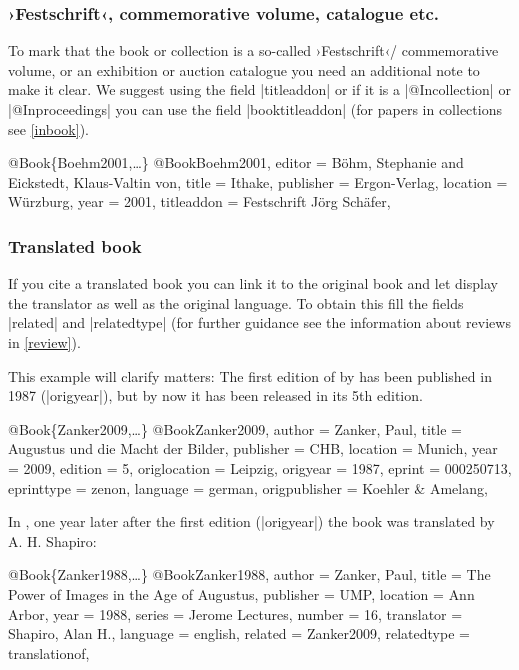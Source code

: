 \documentclass[a4paper,
10pt,
greek,
french,
spanish,
italian,
ngerman,
english
]{ltxdoc}
\begin{document}
\subsubsection{›Festschrift‹, commemorative volume, catalogue etc.}
To mark that the book or collection is a so-called ›Festschrift‹/ commemorative volume, 
or an exhibition or auction catalogue you need an additional note to make it clear.
We suggest using  the field |titleaddon| or if it is a |@Incollection| or |@Inproceedings| you can use the field |booktitleaddon| (for papers in collections see \cref{inbook}).
\begin{bibexample}[label=Boehm2001]{{@}Book\{Boehm2001,…\}}
@Book{Boehm2001,
  editor     = {Böhm, Stephanie and Eickstedt, Klaus-Valtin von},
  title      = {Ithake},
  publisher  = {Ergon-Verlag},
  location   = {Würzburg},
  year       = {2001},
  titleaddon = {Festschrift Jörg Schäfer},
}
\end{bibexample}

 
\subsubsection{Translated book}
If you cite a translated book you can link it to the original book and let display the translator as well as the original language. 
To obtain this fill the fields |related| and |relatedtype| (for further guidance see the information about reviews in \cref{review}).

This example will clarify matters:
The first edition of  by \citeauthor*{Zanker2009} has been published in 1987 (|origyear|), but by now it has been released in its 5th edition.

\begin{bibexample}[label=Zanker2009]{{@}Book\{Zanker2009,…\}}
@Book{Zanker2009,
  author        = {Zanker, Paul},
  title         = {Augustus und die Macht der Bilder},
  publisher     = CHB,   %
  location      = Munich,  %
  year          = {2009},
  edition       = {5},
  origlocation  = Leipzig, %
  origyear      = {1987},
  eprint        = {000250713},
  eprinttype    = {zenon},
  language      = {german},
  origpublisher = {Koehler \& Amelang},
}
\end{bibexample}

In \citeyear{Zanker1988}, one year later after the first edition (|origyear|) the book was translated by A. H. Shapiro:
\begin{bibexample}[label=Zanker1988]{{@}Book\{Zanker1988,…\}}
@Book{Zanker1988,
  author      = {Zanker, Paul},
  title       = {The Power of Images in the Age of Augustus},
  publisher   = UMP,    %
  location    = {Ann Arbor},
  year        = {1988},
  series      = {Jerome Lectures},
  number      = {16},
  translator  = {Shapiro, Alan H.},
  language    = {english},
  related     = {Zanker2009},
  relatedtype = {translationof},
}
\end{bibexample}
\end{document}
